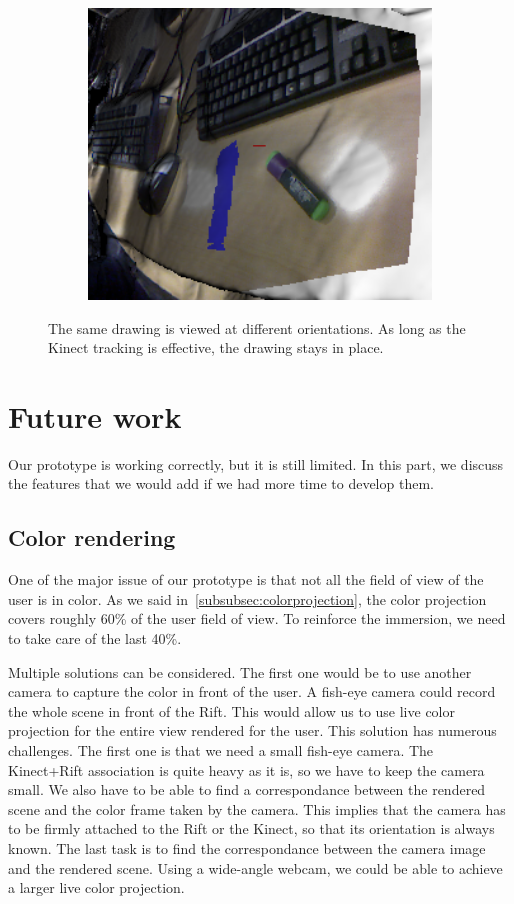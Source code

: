 \documentclass[12pt]{article}
\begin{document}
\begin{figure}[h]
\begin{subfigure}[t]{0.5\textwidth}
    \includegraphics[width=1\textwidth]{Orientation3.png}
    \caption{}
    \end{subfigure}
  \caption{\label{fig:orientation} The same drawing is viewed at different orientations. As long as the Kinect tracking is effective, the drawing stays in place.}
  \par
\end{figure}

\newpage
\section{Future work}
Our prototype is working correctly, but it is still limited. In this part, we discuss the features that we would add if we had more time to develop them.
\subsection{Color rendering}
One of the major issue of our prototype is that not all the field of view of the user is in color. As we said in~\ref{subsubsec:colorprojection}, the color projection covers roughly 60\% of the user field of view. To reinforce the immersion, we need to take care of the last 40\%.

Multiple solutions can be considered. The first one would be to use another camera to capture the color in front of the user. A fish-eye camera could record the whole scene in front of the Rift. This would allow us to use live color projection for the entire view rendered for the user. This solution has numerous challenges. The first one is that we need a small fish-eye camera. The Kinect+Rift association is quite heavy as it is, so we have to keep the camera small. We also have to be able to find a correspondance between the rendered scene and the color frame taken by the camera. This implies that the camera has to be firmly attached to the Rift or the Kinect, so that its orientation is always known. The last task is to find the correspondance between the camera image and the rendered scene. Using a wide-angle webcam, we could be able to achieve a larger live color projection.
\end{document}
